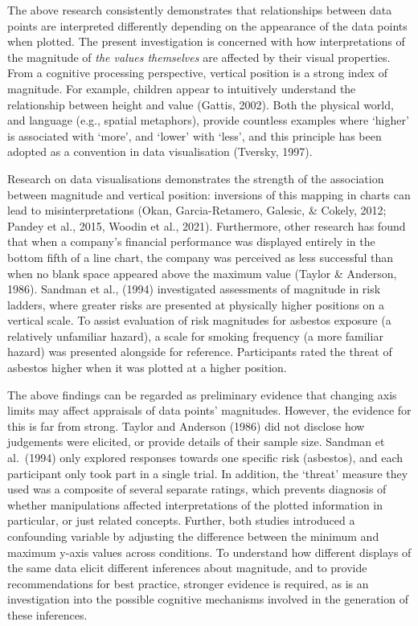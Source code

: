 \documentclass[journal]{vgtc}                %
\begin{document}
The above research consistently demonstrates that relationships between data points are interpreted differently depending on the appearance of the data points when plotted. The present investigation is concerned with how interpretations of the magnitude of \emph{the values themselves} are affected by their visual properties. From a cognitive processing perspective, vertical position is a strong index of magnitude. For example, children appear to intuitively understand the relationship between height and value (Gattis, 2002). Both the physical world, and language (e.g., spatial metaphors), provide countless examples where `higher' is associated with `more', and `lower' with `less', and this principle has been adopted as a convention in data visualisation (Tversky, 1997).

Research on data visualisations demonstrates the strength of the association between magnitude and vertical position: inversions of this mapping in charts can lead to misinterpretations (Okan, Garcia-Retamero, Galesic, \& Cokely, 2012; Pandey et al., 2015, Woodin et al., 2021). Furthermore, other research has found that when a company's financial performance was displayed entirely in the bottom fifth of a line chart, the company was perceived as less successful than when no blank space appeared above the maximum value (Taylor \& Anderson, 1986). Sandman et al., (1994) investigated assessments of magnitude in risk ladders, where greater risks are presented at physically higher positions on a vertical scale. To assist evaluation of risk magnitudes for asbestos exposure (a relatively unfamiliar hazard), a scale for smoking frequency (a more familiar hazard) was presented alongside for reference. Participants rated the threat of asbestos higher when it was plotted at a higher position.~

The above findings can be regarded as preliminary evidence that changing axis limits may affect appraisals of data points' magnitudes. However, the evidence for this is far from strong. Taylor and Anderson (1986) did not disclose how judgements were elicited, or provide details of their sample size. Sandman et al.~(1994) only explored responses towards one specific risk (asbestos), and each participant only took part in a single trial. In addition, the `threat' measure they used was a composite of several separate ratings, which prevents diagnosis of whether manipulations affected interpretations of the plotted information in particular, or just related concepts. Further, both studies introduced a confounding variable by adjusting the difference between the minimum and maximum y-axis values across conditions. To understand how different displays of the same data elicit different inferences about magnitude, and to provide recommendations for best practice, stronger evidence is required, as is an investigation into the possible cognitive mechanisms involved in the generation of these inferences.~
\end{document}
